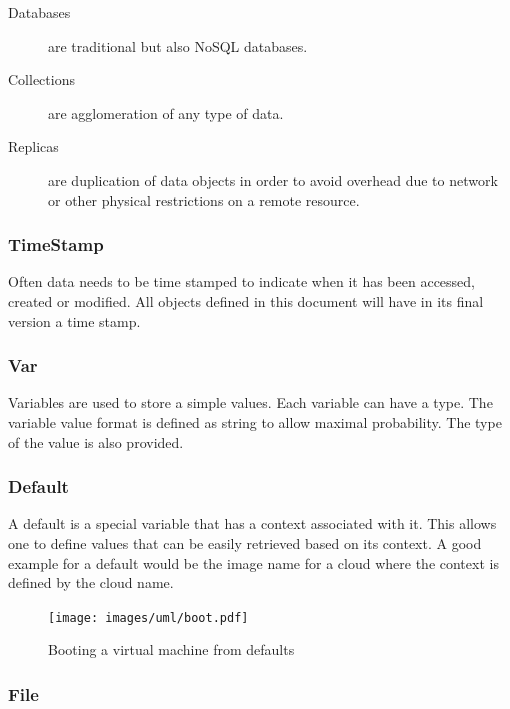 \documentclass[10pt]{article}
\begin{document}
\begin{description}
\item[Databases] are traditional but also NoSQL databases.

\item[Collections] are agglomeration of any type of data.

\item[Replicas] are duplication of data objects in order to avoid
  overhead due to network or other physical restrictions on a remote
  resource.

\end{description}


\subsubsection{TimeStamp}

Often data needs to be time stamped to indicate when it has been
accessed, created or modified. All objects defined in this document
will have in its final version a time stamp.


\subsubsection{Var}

Variables are used to store a simple values. Each variable can have a
type. The variable value format is defined as string to allow maximal
probability. The type of the value is also provided.


\subsubsection{Default}

A default is a special variable that has a context associated with
it. This allows one to define values that can be easily retrieved
based on its context. A good example for a default would be the image
name for a cloud where the context is defined by the cloud name.



\begin{figure}[!h]
\centering
\texttt{[image: images/uml/boot.pdf]}
\caption{Booting a virtual machine from defaults}\label{F:uml-boot}
\end{figure}


\subsubsection{File}
\end{document}
